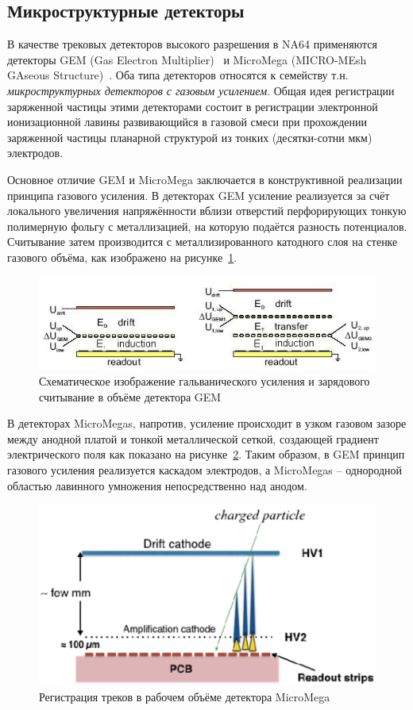 \subsection{Микроструктурные детекторы}

В качестве трековых детекторов высокого разрешения в NA64 применяются
детекторы GEM (Gas Electron Multiplier)~\cite{gems-sauli} и 
MicroMega (MICRO-MEsh GAseous Structure)~\cite{na64-BANERJEE201872}. Оба типа детекторов
относятся к семейству т.н. \emph{микроструктурных детекторов с газовым
усилением}. Общая идея регистрации заряженной частицы этими детекторами
состоит в регистрации электронной ионизационной лавины развивающийся
в газовой смеси при прохождении заряженной частицы планарной структурой
из тонких (десятки-сотни мкм) электродов.

Основное отличие GEM и MicroMega заключается в конструктивной реализации
принципа газового усиления. В детекторах GEM усиление реализуется за счёт
локального увеличения напряжённости вблизи отверстий перфорирующих тонкую
полимерную фольгу с металлизацией, на которую подаётся разность потенциалов.
Считывание затем производится с металлизированного катодного слоя на
стенке газового объёма, как изображено на рисунке~\ref{fig:gem-charge-collection}.
\begin{figure}
    \centering
    \includegraphics[width=0.65\linewidth]{images//illustrative/gem-charge-collection.png}
    \caption{Схематическое изображение гальванического усиления и зарядового
    считывание в объёме детектора GEM \cite{gems-compass}}
    \label{fig:gem-charge-collection}
\end{figure}
В детекторах MicroMegas, напротив, усиление происходит в узком газовом
зазоре между анодной платой и тонкой металлической сеткой, создающей
градиент электрического поля как показано на рисунке~\ref{fig:mumega-charge-collection}.
Таким образом, в GEM принцип газового
усиления реализуется каскадом электродов, а MicroMegas --
однородной областью лавинного умножения непосредственно над анодом.
\begin{figure}
    \centering
    \includegraphics[width=0.65\linewidth]{images//illustrative/mm-charge-collection-example.png}
    \caption{Регистрация треков в рабочем объёме детектора MicroMega \cite{na64-BANERJEE201872}}
    \label{fig:mumega-charge-collection}
\end{figure}

